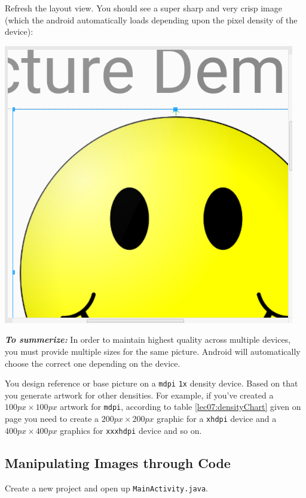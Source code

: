 Refresh the layout view. You should see a super sharp and very crisp image (which the android automatically loads depending upon the pixel density of the device):

\begin{center}
	\includegraphics[scale=0.6]{chapters/ch06/images/12}
\end{center}

\vskip 5mm
\textit{\textbf{To summerize:}} In order to maintain highest quality across multiple devices, you must provide multiple sizes for the same picture. Android will automatically choose the correct one depending on the device. 

You design reference or base picture on a \texttt{mdpi} \texttt{1x} density device. Based on that you generate artwork for other densities. For example, if you've created a $100px \times 100px$ artwork for \texttt{mdpi}, according to table \ref{lec07:densityChart} given on page \pageref{lec07:densityChart} you need to create a $200px \times 200px$ graphic for a \texttt{xhdpi} device and a $400px \times 400px$ graphics for \texttt{xxxhdpi} device and so on.

\subsection{Manipulating Images through Code}
Create a new project and open up \texttt{MainActivity.java}. 

